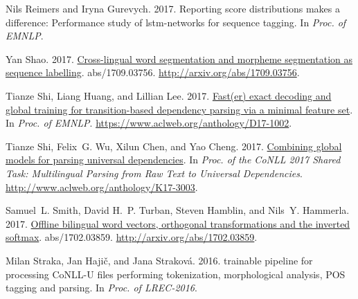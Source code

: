 \documentclass[11pt,a4paper]{article}
\begin{document}
\begin{thebibliography}{}
	Nils Reimers and Iryna Gurevych. 2017.
	\newblock Reporting score distributions makes a difference: Performance study
	of lstm-networks for sequence tagging.
	\newblock In {\em Proc. of EMNLP\/}.
	
	Yan Shao. 2017.
	\newblock \href{http://arxiv.org/abs/1709.03756}{Cross-lingual word
		segmentation and morpheme segmentation as sequence labelling}.
	 abs/1709.03756.
	\newblock
	\href{http://arxiv.org/abs/1709.03756}{http://arxiv.org/abs/1709.03756}.
	
	Tianze Shi, Liang Huang, and Lillian Lee. 2017{}.
	\newblock \href{https://www.aclweb.org/anthology/D17-1002}{Fast(er) exact
		decoding and global training for transition-based dependency parsing via a
		minimal feature set}.
	\newblock In {\em Proc. of EMNLP\/}.
	\newblock
	\href{https://www.aclweb.org/anthology/D17-1002}{https://www.aclweb.org/anthology/D17-1002}.
	
	Tianze Shi, Felix~G. Wu, Xilun Chen, and Yao Cheng. 2017{}.
	\newblock \href{http://www.aclweb.org/anthology/K17-3003}{Combining global
		models for parsing universal dependencies}.
	\newblock In {\em Proc. of the CoNLL 2017 Shared Task: Multilingual Parsing
		from Raw Text to Universal Dependencies\/}.
	\newblock
	\href{http://www.aclweb.org/anthology/K17-3003}{http://www.aclweb.org/anthology/K17-3003}.
	
	Samuel~L. Smith, David H.~P. Turban, Steven Hamblin, and Nils~Y. Hammerla.
	2017.
	\newblock \href{http://arxiv.org/abs/1702.03859}{Offline bilingual word
		vectors, orthogonal transformations and the inverted softmax}.
	 abs/1702.03859.
	\newblock
	\href{http://arxiv.org/abs/1702.03859}{http://arxiv.org/abs/1702.03859}.
	
	Milan Straka, Jan Haji\v{c}, and Jana Strakov\'{a}. 2016.
	 trainable pipeline for processing {CoNLL-U} files
	performing tokenization, morphological analysis, {POS} tagging and parsing.
	\newblock In {\em Proc. of LREC-2016\/}.
	

\end{thebibliography}
\end{document}
